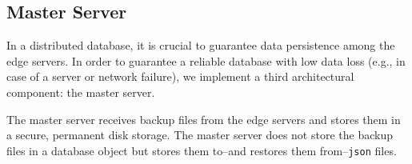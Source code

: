 \subsection{Master Server}
In a distributed database, it is crucial to guarantee data persistence among the edge servers. In order to guarantee a reliable database with low data loss (e.g., in case of a server or network failure), we implement a third architectural component: the master server.

The master server receives backup files from the edge servers and stores them in a secure, permanent disk storage. The master server does not store the backup files in a database object but stores them to--and restores them from--\texttt{json} files.
